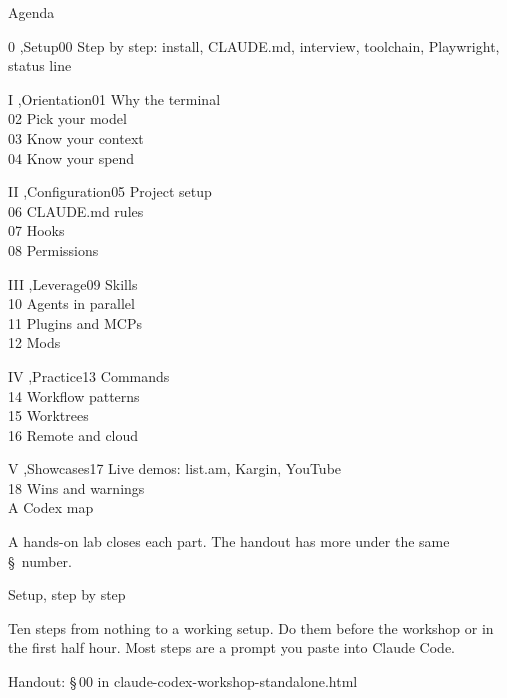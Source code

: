 \documentclass[aspectratio=169,11pt,t]{beamer}
\newcommand{\partframe}[4]{%
  \setsec{}%
  \begin{frame}[c]
    \lbl{Part #1}\par\vspace{0.5em}
    {\seriffamily\fontsize{40}{42}\selectfont #2}\par\vspace{0.8em}
    \begin{minipage}{0.8\textwidth}\raggedright\color{muted}#4\end{minipage}\par\vspace{1.4em}
    {\ttfamily\scriptsize\color{dim}Handout: \S\,#3 in claude-codex-workshop-standalone.html}
  \end{frame}}
\begin{document}
\begin{frame}{Agenda}
  \begin{tcbraster}[raster columns=3, raster equal height, raster column skip=6pt, raster row skip=6pt]
    \begin{card}{0 \sep Setup}00 Step by step: install, CLAUDE.md, interview, toolchain, Playwright, status line\end{card}
    \begin{card}{I \sep Orientation}01 Why the terminal\\02 Pick your model\\03 Know your context\\04 Know your spend\end{card}
    \begin{card}{II \sep Configuration}05 Project setup\\06 CLAUDE.md rules\\07 Hooks\\08 Permissions\end{card}
    \begin{card}{III \sep Leverage}09 Skills\\10 Agents in parallel\\11 Plugins and MCPs\\12 Mods\end{card}
    \begin{card}{IV \sep Practice}13 Commands\\14 Workflow patterns\\15 Worktrees\\16 Remote and cloud\end{card}
    \begin{card}{V \sep Showcases}17 Live demos: list.am, Kargin, YouTube\\18 Wins and warnings\\A Codex map\end{card}
  \end{tcbraster}
  \vspace{0.4em}
  {\small A hands-on lab closes each part. The handout has more under the same \S\ number.}
\end{frame}

\partframe{0}{Setup, step by step}{00}{Ten steps from nothing to a working setup. Do them before the workshop or in the first half hour. Most steps are a prompt you paste into Claude Code.}
\end{document}
